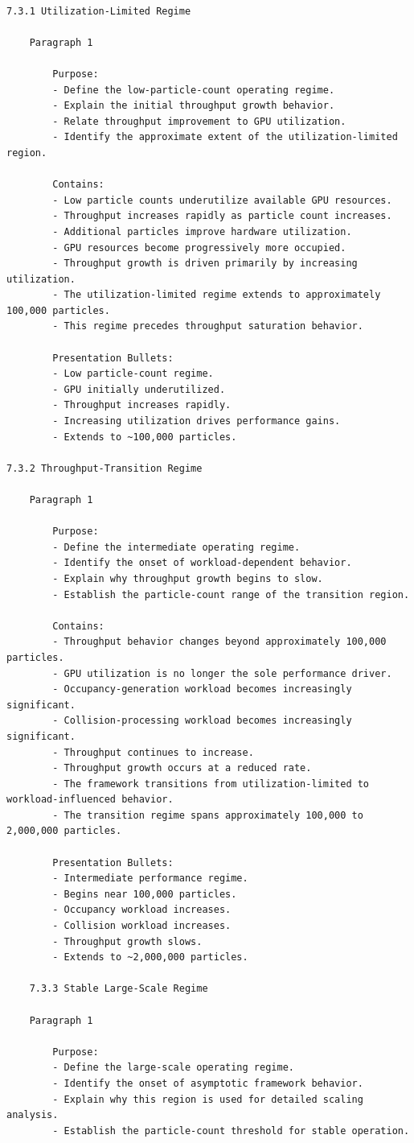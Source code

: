 \begin{verbatim}
		
7.3.1 Utilization-Limited Regime

	Paragraph 1

		Purpose:
		- Define the low-particle-count operating regime.
		- Explain the initial throughput growth behavior.
		- Relate throughput improvement to GPU utilization.
		- Identify the approximate extent of the utilization-limited region.

		Contains:
		- Low particle counts underutilize available GPU resources.
		- Throughput increases rapidly as particle count increases.
		- Additional particles improve hardware utilization.
		- GPU resources become progressively more occupied.
		- Throughput growth is driven primarily by increasing utilization.
		- The utilization-limited regime extends to approximately 100,000 particles.
		- This regime precedes throughput saturation behavior.

		Presentation Bullets:
		- Low particle-count regime.
		- GPU initially underutilized.
		- Throughput increases rapidly.
		- Increasing utilization drives performance gains.
		- Extends to ~100,000 particles.		
		
7.3.2 Throughput-Transition Regime

	Paragraph 1

		Purpose:
		- Define the intermediate operating regime.
		- Identify the onset of workload-dependent behavior.
		- Explain why throughput growth begins to slow.
		- Establish the particle-count range of the transition region.

		Contains:
		- Throughput behavior changes beyond approximately 100,000 particles.
		- GPU utilization is no longer the sole performance driver.
		- Occupancy-generation workload becomes increasingly significant.
		- Collision-processing workload becomes increasingly significant.
		- Throughput continues to increase.
		- Throughput growth occurs at a reduced rate.
		- The framework transitions from utilization-limited to workload-influenced behavior.
		- The transition regime spans approximately 100,000 to 2,000,000 particles.

		Presentation Bullets:
		- Intermediate performance regime.
		- Begins near 100,000 particles.
		- Occupancy workload increases.
		- Collision workload increases.
		- Throughput growth slows.
		- Extends to ~2,000,000 particles.
		
	7.3.3 Stable Large-Scale Regime

	Paragraph 1

		Purpose:
		- Define the large-scale operating regime.
		- Identify the onset of asymptotic framework behavior.
		- Explain why this region is used for detailed scaling analysis.
		- Establish the particle-count threshold for stable operation.


\end{verbatim}
